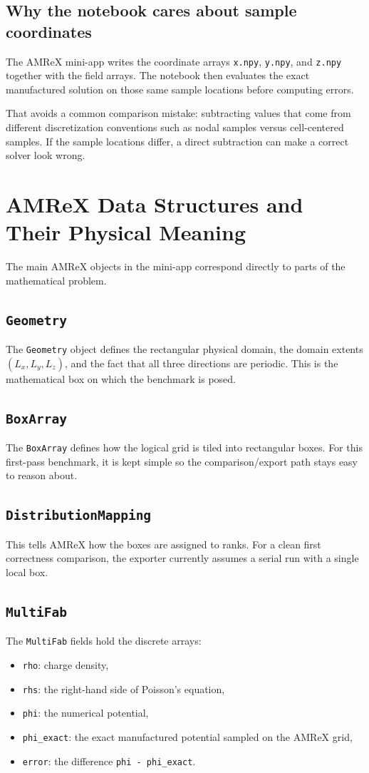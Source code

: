 \documentclass[11pt]{article}
\begin{document}
\subsection*{Why the notebook cares about sample coordinates}
The AMReX mini-app writes the coordinate arrays \texttt{x.npy}, \texttt{y.npy}, and \texttt{z.npy} together with the field arrays. The notebook then evaluates the exact manufactured solution on those same sample locations before computing errors.

That avoids a common comparison mistake: subtracting values that come from different discretization conventions such as nodal samples versus cell-centered samples. If the sample locations differ, a direct subtraction can make a correct solver look wrong.

\section{AMReX Data Structures and Their Physical Meaning}
The main AMReX objects in the mini-app correspond directly to parts of the mathematical problem.

\subsection*{\texttt{Geometry}}
The \texttt{Geometry} object defines the rectangular physical domain, the domain extents $(L_x,L_y,L_z)$, and the fact that all three directions are periodic. This is the mathematical box on which the benchmark is posed.

\subsection*{\texttt{BoxArray}}
The \texttt{BoxArray} defines how the logical grid is tiled into rectangular boxes. For this first-pass benchmark, it is kept simple so the comparison/export path stays easy to reason about.

\subsection*{\texttt{DistributionMapping}}
This tells AMReX how the boxes are assigned to ranks. For a clean first correctness comparison, the exporter currently assumes a serial run with a single local box.

\subsection*{\texttt{MultiFab}}
The \texttt{MultiFab} fields hold the discrete arrays:
\begin{itemize}
\item \texttt{rho}: charge density,
\item \texttt{rhs}: the right-hand side of Poisson's equation,
\item \texttt{phi}: the numerical potential,
\item \texttt{phi\_exact}: the exact manufactured potential sampled on the AMReX grid,
\item \texttt{error}: the difference \texttt{phi - phi\_exact}.
\end{itemize}
\end{document}
